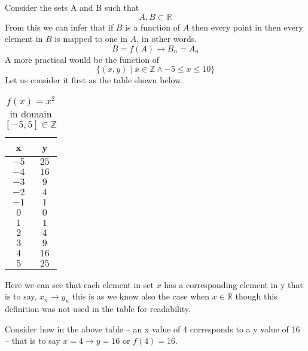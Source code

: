 Consider the sets A and B such that
\[
A,B \subset{\mathbb{R}}
\]
From this we can infer that if \(B\) is a function of \(A\) then every point in then every element in \(B\) is mapped to one in \(A\), in other words.
\[
B = f(A) \rightarrow B_n = A_n
\]
A more practical would be the function of 
\[
 \{(x,y) \; | \; x \in \mathbb{Z} \wedge -5 \leq x \leq 10\} 
\]
Let us consider it first as the table shown below.

\begin{table}[htp]
    \centering
    \begin{tabular}{cc}
    \toprule
    x & y \\ 
    \midrule
        \(-5\) & \(25\) \\
        \(-4\) & \(16\) \\
        \(-3\) & \(9\) \\
        \(-2\) & \(4\) \\
        \(-1\) & \(1\) \\
        \(0\) & \(0\) \\
        \(1\) & \(1\) \\
        \(2\) & \(4\) \\
        \(3\) & \(9\) \\
        \(4\) & \(16\) \\
        \(5\) & \(25\)
    \\ \bottomrule\end{tabular}
    \caption{\(f(x) = x^2\) in domain \([-5, 5] \in \mathbb{Z}\)}
\end{table}

Here we can see that each element in set \(x\) has a corresponding element in y that is to say, \(x_n \rightarrow y_n\) this is as we know also the case when \(x \in \mathbb{R}\) though this definition was not used in the table for readability.

Consider how in the above table – an x value of 4 corresponds to a y value of 16 – that is to say \(x = 4 \rightarrow y=16\) or \(f(4) = 16\).


